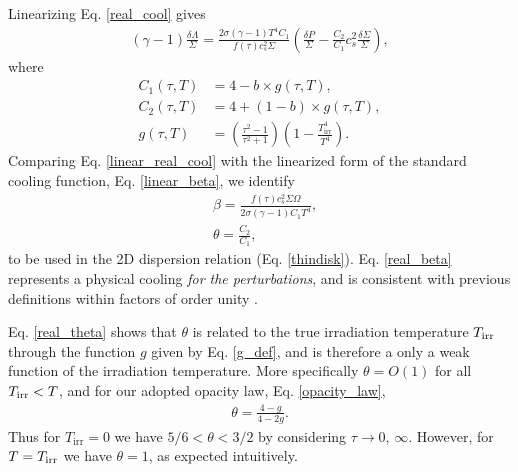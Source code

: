Linearizing Eq. \ref{real_cool} gives   
\begin{align}\label{linear_real_cool}
  (\gamma-1)\frac{\delta\Lambda}{\Sigma} = \frac{2\sigma(\gamma-1)
    T^4C_1}{f(\tau)c_{s}^2\Sigma}\left(\frac{\delta P}{\Sigma} -
  \frac{C_2}{C_1}c_{s}^2\frac{\delta\Sigma}{\Sigma}\right), 
\end{align}
where
\begin{align}
C_1(\tau, T) &= 4 - b\times g(\tau, T),\\ 
C_2(\tau, T) &= 4 + (1-b)\times g(\tau, T),\\ 
  g(\tau, T) &= \left( \frac{\tau^2-1}{\tau^2+1}\right)\left(1 -
  \frac{T_\mathrm{irr}^4}{T^4}\right). \label{g_def}
\end{align}
Comparing Eq. \ref{linear_real_cool} with the linearized form of the
standard cooling function, Eq. \ref{linear_beta}, we identify
\begin{align}
  &\beta = \frac{f(\tau)c_s^2\Sigma\Omega}{2\sigma(\gamma-1)C_1T^4},\label{real_beta}\\
  &\theta = \frac{C_2}{C_1},\label{real_theta} 
\end{align}
to be used in the 2D dispersion relation (Eq. \ref{thindisk}). 
Eq. \ref{real_beta} represents a physical cooling \emph{for the
  perturbations}, and is consistent with previous definitions within
factors of order unity \citep[e.g.][their Eq. 2]{kratter10}.  

Eq. \ref{real_theta} shows that $\theta$ 
is related to the true irradiation temperature $T_\mathrm{irr}$ through the function $g$ given by 
Eq. \ref{g_def}, and is therefore a only a weak function of the irradiation temperature. 
More specifically $\theta = O(1)$ 
for all $T_\mathrm{irr} <T$, and for our adopted opacity law, Eq. \ref{opacity_law}, 
\begin{align*}
  \theta = \frac{4-g}{4-2g}. 
\end{align*}
Thus for $T_\mathrm{irr} = 0$ we have $5/6<\theta<3/2$ by considering
$\tau\to 0,\,\infty$. However, for $T=T_\mathrm{irr}$ we have $\theta = 1$, as
expected intuitively.    

